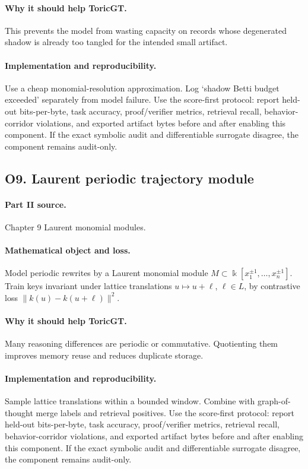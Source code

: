 \documentclass[11pt]{article}
\theoremstyle{definition}
\newcommand{\kk}{\Bbbk}
\begin{document}
\paragraph{Why it should help ToricGT.} This prevents the model from wasting capacity on records whose degenerated shadow is already too tangled for the intended small artifact.
\paragraph{Implementation and reproducibility.} Use a cheap monomial-resolution approximation.  Log `shadow Betti budget exceeded' separately from model failure.  Use the score-first protocol: report held-out bits-per-byte, task accuracy, proof/verifier metrics, retrieval recall, behavior-corridor violations, and exported artifact bytes before and after enabling this component.  If the exact symbolic audit and differentiable surrogate disagree, the component remains audit-only.


\subsection{O9. Laurent periodic trajectory module}
\paragraph{Part II source.} Chapter 9 Laurent monomial modules.
\paragraph{Mathematical object and loss.} Model periodic rewrites by a Laurent monomial module $M\subset\kk[x_1^{\pm1},\ldots,x_n^{\pm1}]$.  Train keys invariant under lattice translations $u\mapsto u+\ell$, $\ell\in L$, by contrastive loss $\|k(u)-k(u+\ell)\|^2$.
\paragraph{Why it should help ToricGT.} Many reasoning differences are periodic or commutative.  Quotienting them improves memory reuse and reduces duplicate storage.
\paragraph{Implementation and reproducibility.} Sample lattice translations within a bounded window.  Combine with graph-of-thought merge labels and retrieval positives.  Use the score-first protocol: report held-out bits-per-byte, task accuracy, proof/verifier metrics, retrieval recall, behavior-corridor violations, and exported artifact bytes before and after enabling this component.  If the exact symbolic audit and differentiable surrogate disagree, the component remains audit-only.
\end{document}
